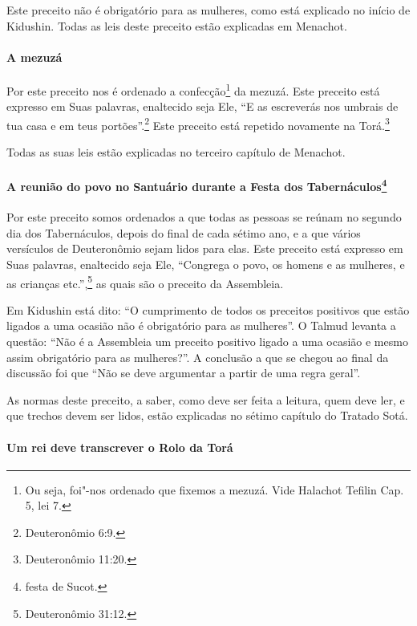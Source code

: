 \begin{multicols}{2}
Este preceito não é obrigatório para as mulheres, como está explicado no
início de Kidushin\starr. Todas as leis deste preceito estão explicadas em
Menachot\starr.

\paragraph{A mezuzá\starr}

Por este preceito nos é ordenado a confecção\footnote{Ou seja, foi"-nos ordenado que fixemos a mezuzá\starr. Vide Halachot Tefilin\starr{} Cap. 5, lei 7.} da
mezuzá\starr. Este
preceito está expresso em Suas palavras, enaltecido seja Ele, ``E as
escreverás
nos umbrais de tua casa e em teus portões''.\footnote{Deuteronômio 6:9.} Este
preceito está repetido novamente na Torá\starr.\footnote{Deuteronômio 11:20.}

Todas as suas leis estão explicadas no terceiro capítulo de Menachot\starr.

\paragraph{A reunião do povo no Santuário durante a Festa dos
Tabernáculos\protect\footnote{festa de Sucot\starr.}}

Por este preceito somos ordenados a que todas as pessoas se reúnam no
segundo dia dos Tabernáculos, depois do final de cada sétimo ano, e a
que vários versículos de Deuteronômio sejam lidos para elas. Este
preceito está expresso em Suas palavras, enaltecido seja Ele, ``Congrega
o povo, os homens e as mulheres, e as crianças etc.'',\footnote{Deuteronômio
31:12.} as quais são o preceito da Assembleia.

Em Kidushin\starr{} está dito: ``O cumprimento de todos os preceitos positivos
que estão ligados a uma ocasião não é obrigatório para as mulheres''. O
Talmud\starr{} levanta a questão: ``Não é a Assembleia um preceito positivo
ligado a uma ocasião e mesmo assim obrigatório para as mulheres?''. A
conclusão a que se chegou ao final da discussão foi que ``Não se deve
argumentar a partir de uma regra geral''.

As normas deste preceito, a saber, como deve ser feita a leitura, quem
deve ler, e que trechos devem ser lidos, estão explicadas no sétimo
capítulo do Tratado Sotá\starr.

\paragraph{Um rei deve transcrever o Rolo da Torá\starr{}}


\end{multicols}
